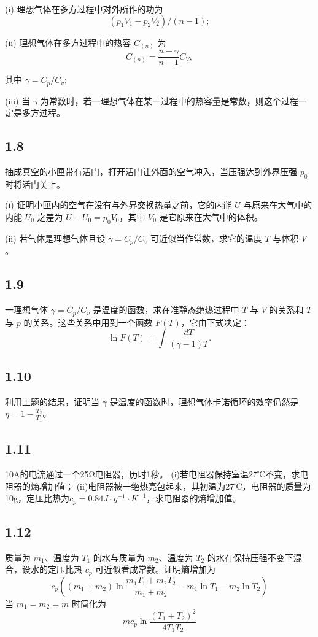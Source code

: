 (i) 理想气体在多方过程中对外所作的功为
$$ (p_1 V_1 - p_2 V_2) / (n-1); $$

(ii) 理想气体在多方过程中的热容 $C_{(n)}$ 为
$$ C_{(n)} = \frac{n - \gamma}{n - 1} C_V, $$

其中 $\gamma = C_p / C_v$;

(iii) 当 $\gamma$ 为常数时，若一理想气体在某一过程中的热容量是常数，则这个过程一定是多方过程。

\newpage
\subsection{1.8}
抽成真空的小匣带有活门，打开活门让外面的空气冲入，当压强达到外界压强 $p_0$ 时将活门关上。

(i) 证明小匣内的空气在没有与外界交换热量之前，它的内能 $U$ 与原来在大气中的内能 $U_0$ 之差为 $U - U_0 = p_0 V_0$，其中 $V_0$ 是它原来在大气中的体积。

(ii) 若气体是理想气体且设 $\gamma = C_p / C_v$ 可近似当作常数，求它的温度 $T$ 与体积 $V$。

\newpage
\subsection{1.9}
一理想气体 $\gamma = C_p / C_v$ 是温度的函数，求在准静态绝热过程中 $T$ 与 $V$ 的关系和 $T$ 与 $p$ 的关系。这些关系中用到一个函数 $F(T)$，它由下式决定：
$$ \ln F(T) = \int \frac{dT}{(\gamma - 1)T}. $$

\newpage
\subsection{1.10}
利用上题的结果，证明当 $\gamma$ 是温度的函数时，理想气体卡诺循环的效率仍然是 $\eta = 1 - \frac{T_2}{T_1}$。

\newpage
\subsection{1.11}
10A的电流通过一个25Ω电阻器，历时1秒。
(i)若电阻器保持室温27℃不变，求电阻器的熵增加值；
(ii)电阻器被一绝热亮包起来，其初温为27℃，电阻器的质量为10g，定压比热为$c_p = 0.84J \cdot g^{-1} \cdot K^{-1}$，求电阻器的熵增加值。

\newpage
\subsection{1.12}
质量为 $m_1$、温度为 $T_1$ 的水与质量为 $m_2$、温度为 $T_2$ 的水在保持压强不变下混合，设水的定压比热 $c_p$ 可近似看成常数。证明熵增加为
$$c_p \left( (m_1 + m_2) \ln \frac{m_1 T_1 + m_2 T_2}{m_1 + m_2} - m_1 \ln T_1 - m_2 \ln T_2 \right)$$
当 $m_1 = m_2 = m$ 时简化为
$$mc_p \ln \frac{(T_1 + T_2)^2}{4 T_1 T_2}$$

